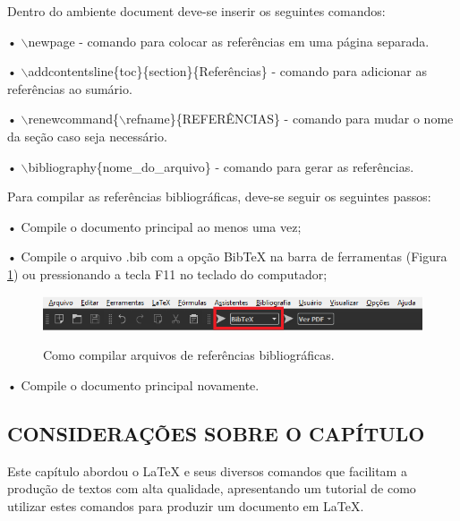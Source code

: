Dentro do ambiente document deve-se inserir os seguintes comandos:

•	$\backslash$newpage - comando para colocar as referências em uma página separada.

•	$\backslash$addcontentsline\{toc\}\{section\}\{Referências\} - comando para adicionar as referências ao sumário.

•	$\backslash$renewcommand\{$\backslash$refname\}\{REFERÊNCIAS\} - comando para mudar o nome da seção caso seja necessário.

•	$\backslash$bibliography\{nome\_do\_arquivo\} - comando para gerar as referências.

Para compilar as referências bibliográficas, deve-se seguir os seguintes passos:

•	Compile o documento principal ao menos uma vez;

•	Compile o arquivo .bib com a opção BibTeX na barra de ferramentas (Figura \ref{compRef}) ou pressionando a tecla F11 no teclado do computador;

\begin{figure}[h]
	\centering
	\includegraphics[scale=0.5]{imagens/compilarRef.png}\\
	\caption{Como compilar arquivos de referências bibliográficas.}
	\label{compRef}
\end{figure}

•	Compile o documento principal novamente.

\subsection{CONSIDERAÇÕES SOBRE O CAPÍTULO}
Este capítulo abordou o LaTeX e seus diversos comandos que facilitam a produção de textos com alta qualidade, apresentando um tutorial de como utilizar estes comandos para produzir um documento em LaTeX.